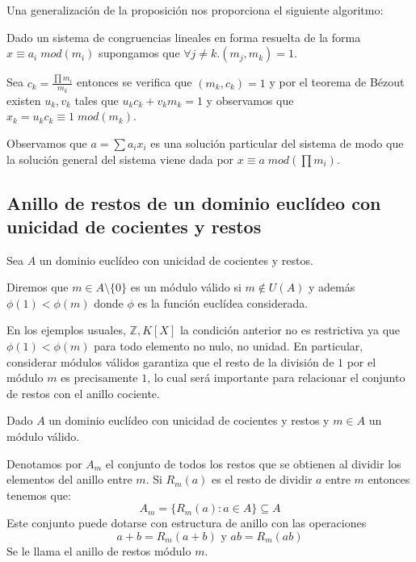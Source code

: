 Una generalización de la proposición nos proporciona el siguiente algoritmo:

\begin{proposition}
Dado un sistema de congruencias lineales en forma resuelta de la forma $x \equiv a_i \; mod(m_i)$ supongamos que $\forall j \neq k. (m_j,m_k) = 1$. 

Sea $c_k = \frac{\prod m_i}{m_k}$ entonces se verifica que $(m_k,c_k) = 1$ y por el teorema de Bézout existen $u_k,v_k$ tales que $u_kc_k+v_km_k = 1$ y observamos que $x_k = u_kc_k \equiv 1 \; mod(m_k)$. 

Observamos que $a = \sum a_ix_i$ es una solución particular del sistema de modo que la solución general del sistema viene dada por $x \equiv a \; mod(\prod m_i)$. 
\end{proposition}

\subsection{Anillo de restos de un dominio euclídeo con unicidad de cocientes y restos}

\begin{definition}
Sea $A$ un dominio euclídeo con unicidad de cocientes y restos.

Diremos que $m \in A \setminus \{0\}$ es un módulo válido si $m \notin U(A)$ y además $\phi(1) < \phi(m)$ donde $\phi$ es la función euclídea considerada. 
\end{definition}

En los ejemplos usuales, $\mathbb{Z},K[X]$ la condición anterior no es restrictiva ya que $\phi(1) < \phi(m)$ para todo elemento no nulo, no unidad. En particular, considerar módulos válidos garantiza que el resto de la división de $1$ por el módulo $m$ es precisamente $1$, lo cual será importante para relacionar el conjunto de restos con el anillo cociente. 

\begin{definition}
Dado $A$ un dominio euclídeo con unicidad de cocientes y restos y $m \in A$ un módulo válido. 

Denotamos por $A_m$ el conjunto de todos los restos que se obtienen al dividir los elementos del anillo entre $m$. Si $R_m(a)$ es el resto de dividir $a$ entre $m$ entonces tenemos que: $$A_m = \{R_m(a):a \in A\} \subseteq A$$ Este conjunto puede dotarse con estructura de anillo con las operaciones $$a+b = R_m(a+b) \text{ y } ab = R_m(ab)$$ Se le llama el anillo de restos módulo $m$.  
\end{definition}

